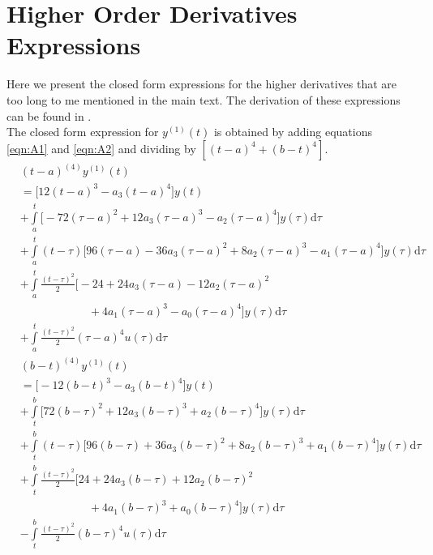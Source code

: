\documentclass[letterpaper%
, twoside%
, 12pt%
,memoire%
, english%
,creativecommons,hyperref%
]{thETS}
\theoremstyle{newThmStyle}
\begin{document}
\section{Higher Order Derivatives Expressions} \label{Sec:App1}
Here we present the closed form expressions for the higher derivatives that are too long to me mentioned in the main text. The derivation of these expressions can be found in \citep{RN120}.\\
The closed form expression for $y^{(1)}(t)$ is obtained by adding equations \eqref{eqn:A1} and \eqref{eqn:A2} and dividing by $[(t-a)^{4}+(b-t)^{4}]$.
\begin{equation}\label{eqn:A1}
\begin{split}
	&(t-a)^{(4)}y^{(1)}(t)\\
	&=\bigg[ 12(t-a)^{3}-a_3(t-a)^{4}\bigg]y(t)\\
	&+\int\limits_{a}^{t}\bigg[-72(\tau-a)^{2}+12a_3(\tau-a)^{3}-a_2(\tau-a)^4\bigg]y(\tau)\mathrm{d}\tau\\
	&+\int\limits_{a}^{t}(t-\tau)\bigg[96(\tau-a)-36a_3(\tau-a)^{2}+8a_2(\tau-a)^{3}-a_1(\tau-a)^{4}\bigg]y(\tau)\mathrm{d}\tau\\
	&+\int\limits_{a}^{t}\frac{(t-\tau)^{2}}{2}\bigg[-24+24a_3(\tau-a)-12a_2(\tau-a)^{2}
	\\&\qquad\qquad\qquad{}+4a_1(\tau-a)^{3}-a_0(\tau-a)^{4}\bigg]y(\tau)\mathrm{d}\tau\\
	&+\int\limits_{a}^{t}\frac{(t-\tau)^{2}}{2}(\tau-a)^{4}u(\tau)\mathrm{d}\tau	
\end{split}
\end{equation}
\begin{equation}\label{eqn:A2}
\begin{split}
	&(b-t)^{(4)}y^{(1)}(t)\\
	&=\bigg[-12(b-t)^{3}-a_3(b-t)^{4} \bigg]y(t)\\
	&+\int\limits_{t}^{b}\bigg[72(b-\tau)^{2}+12a_3(b-\tau)^{3}+a_2(b-\tau)^4\bigg]y(\tau)\mathrm{d}\tau\\
	&+\int\limits_{t}^{b}(t-\tau)\bigg[96(b-\tau)+36a_3(b-\tau)^{2}+8a_2(b-\tau)^{3}+a_1(b-\tau)^{4}\bigg]y(\tau)\mathrm{d}\tau\\
	&+\int\limits_{t}^{b}\frac{(t-\tau)^{2}}{2}\bigg[24+24a_3(b-\tau)+12a_2(b-\tau)^{2}
	\\&\qquad\qquad\qquad{}+4a_1(b-\tau)^{3}+a_0(b-\tau)^{4}\bigg]y(\tau)\mathrm{d}\tau\\
	&-\int\limits_{t}^{b}\frac{(t-\tau)^{2}}{2}(b-\tau)^{4}u(\tau)\mathrm{d}\tau	
\end{split}
\end{equation}
\end{document}
